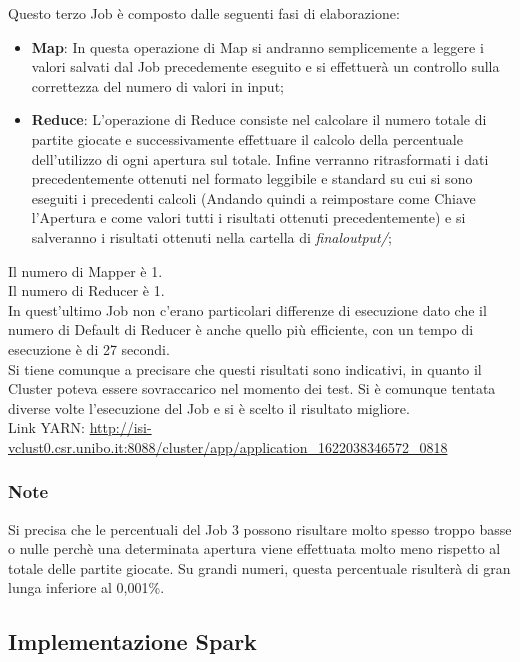 \documentclass[10pt]{article}
\begin{document}
Questo terzo Job \`e composto dalle seguenti fasi di elaborazione:

\begin{itemize}
    \item \textbf{Map}: In questa operazione di Map si andranno semplicemente a leggere i valori salvati dal Job precedemente eseguito e si effettuer\`a un controllo sulla correttezza del numero di valori in input;
    \item \textbf{Reduce}: L'operazione di Reduce consiste nel calcolare il numero totale di partite giocate e successivamente effettuare il calcolo della percentuale dell'utilizzo di ogni apertura sul totale. Infine verranno ritrasformati i dati precedentemente ottenuti nel formato leggibile e standard su cui si sono eseguiti i precedenti calcoli (Andando quindi a reimpostare come Chiave l'Apertura e come valori tutti i risultati ottenuti precedentemente) e si salveranno i risultati ottenuti nella cartella di \textit{finaloutput/};
\end{itemize}
Il numero di Mapper \`e 1.\\
Il numero di Reducer \`e 1.\\
In quest'ultimo Job non c'erano particolari differenze di esecuzione dato che il numero di Default di Reducer \`e anche quello pi\`u efficiente, con un tempo di esecuzione \`e di 27 secondi.\\
Si tiene comunque a precisare che questi risultati sono indicativi, in quanto il Cluster poteva essere sovraccarico nel momento dei test. Si \`e comunque tentata diverse volte l'esecuzione del Job e si \`e scelto il risultato migliore.\\
Link YARN: \url{http://isi-vclust0.csr.unibo.it:8088/cluster/app/application_1622038346572_0818}

\subsubsection{Note}

Si precisa che le percentuali del Job 3 possono risultare molto spesso troppo basse o nulle perch\`e una determinata apertura viene effettuata molto meno rispetto al totale delle partite giocate. Su grandi numeri, questa percentuale risulter\`a di gran lunga inferiore al 0,001\%.

\subsection{Implementazione Spark}
\end{document}
